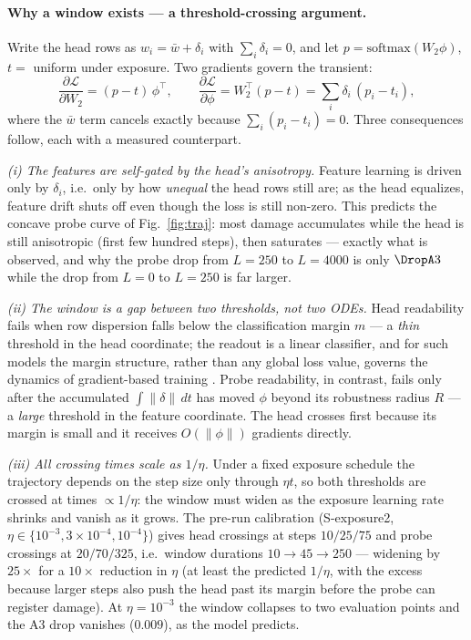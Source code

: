 \documentclass[review,12pt]{elsarticle}
\begin{document}
\paragraph{Why a window exists --- a threshold-crossing argument.}
Write the head rows as $w_i = \bar w + \delta_i$ with $\sum_i \delta_i=0$, and
let $p=\mathrm{softmax}(W_2\phi)$, $t=$ uniform under exposure. Two gradients
govern the transient:
\begin{equation}
\frac{\partial \mathcal L}{\partial W_2} = (p-t)\,\phi^{\top},
\qquad
\frac{\partial \mathcal L}{\partial \phi} = W_2^{\top}(p-t)
= \textstyle\sum_i \delta_i\,(p_i-t_i),
\end{equation}
where the $\bar w$ term cancels exactly because $\sum_i(p_i-t_i)=0$. Three
consequences follow, each with a measured counterpart.

\emph{(i) The features are self-gated by the head's anisotropy.} Feature
learning is driven only by $\delta_i$, i.e.\ only by how \emph{unequal} the head
rows still are; as the head equalizes, feature drift shuts off even though the
loss is still non-zero. This predicts the concave probe curve of
Fig.~\ref{fig:traj}: most damage accumulates while the head is still
anisotropic (first few hundred steps), then saturates --- exactly what is
observed, and why the probe drop from $L{=}250$ to $L{=}4000$ is only
$\DropA3$ while the drop from $L{=}0$ to $L{=}250$ is far larger.

\emph{(ii) The window is a gap between two thresholds, not two ODEs.} Head
readability fails when row dispersion falls below the classification margin
$m$ --- a \emph{thin} threshold in the head coordinate; the readout is a linear
classifier, and for such models the margin structure, rather than any global
loss value, governs the dynamics of gradient-based training
\cite{soudry2018implicit}. Probe readability, in contrast, fails only after the
accumulated $\int\|\delta\|\,dt$ has moved $\phi$ beyond its robustness radius
$R$ --- a \emph{large} threshold in the feature coordinate. The head crosses
first because its margin is small and it receives $O(\|\phi\|)$ gradients
directly.

\emph{(iii) All crossing times scale as $1/\eta$.} Under a fixed exposure
schedule the trajectory depends on the step size only through $\eta t$, so
both thresholds are crossed at times $\propto1/\eta$: the window must widen as
the exposure learning rate shrinks and vanish as it grows. The pre-run
calibration (S-exposure2, $\eta\in\{10^{-3},3{\times}10^{-4},10^{-4}\}$) gives
head crossings at steps $10/25/75$ and probe crossings at $20/70/325$, i.e.\
window durations $10\to45\to250$ --- widening by $25\times$ for a $10\times$
reduction in $\eta$ (at least the predicted $1/\eta$, with the excess because
larger steps also push the head past its margin before the probe can register
damage). At $\eta=10^{-3}$ the window collapses to two evaluation points and
the A3 drop vanishes ($0.009$), as the model predicts.
\end{document}
